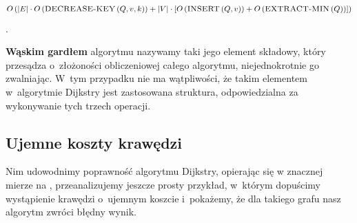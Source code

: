 \begin{equation}
O \left( \left| E \right| \cdot O \left( \textrm{\textsc{DECREASE-KEY}} \left( Q, v, k \right) \right) + \left| V \right| \cdot \left[ O \left( \textrm{\textsc{INSERT}} \left( Q, v \right) \right) + O \left( \textrm{\textsc{EXTRACT-MIN}} \left( Q \right) \right) \right] \right)
\end{equation}\label{eq:dijkstraComplexity}.

\textbf{Wąskim gardłem} algorytmu nazywamy taki jego element składowy, który przesądza o~złożoności obliczeniowej całego algorytmu, niejednokrotnie go zwalniając. W~tym przypadku nie ma wątpliwości, że takim elementem w~algorytmie Dijkstry jest zastosowana struktura, odpowiedzialna za wykonywanie tych trzech operacji.

\subsection{Ujemne koszty krawędzi}

Nim udowodnimy poprawność algorytmu Dijkstry, opierając się w znacznej mierze na \cite[$24.6$]{Cormen}, przeanalizujemy jeszcze prosty przykład, w~którym dopuścimy wystąpienie krawędzi o~ujemnym koszcie i~pokażemy, że dla takiego grafu nasz algorytm zwróci błędny wynik.

